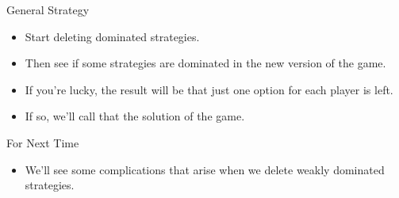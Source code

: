 \documentclass[
  ignorenonframetext,
]{beamer}
\providecommand{\tightlist}{%
  \setlength{\itemsep}{0pt}\setlength{\parskip}{0pt}}
\begin{document}
\begin{frame}{General Strategy}
\protect\hypertarget{general-strategy}{}
\begin{itemize}
\tightlist
\item
  Start deleting dominated strategies.
\item
  Then see if some strategies are dominated in the new version of the
  game.
\item
  If you're lucky, the result will be that just one option for each
  player is left.
\item
  If so, we'll call that the solution of the game.
\end{itemize}
\end{frame}

\begin{frame}{For Next Time}
\protect\hypertarget{for-next-time}{}
\begin{itemize}
\tightlist
\item
  We'll see some complications that arise when we delete weakly
  dominated strategies.
\end{itemize}
\end{frame}
\end{document}
